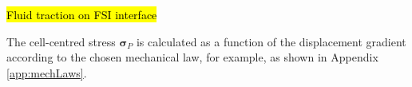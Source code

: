 \documentclass[sn-mathphys,Numbered]{sn-jnl}%
\newcommand{\bb}{\boldsymbol}
\begin{document}
\hl{Fluid traction on FSI interface}

The cell-centred stress $\bb{\sigma}_P$ is calculated as a function of the displacement gradient according to the chosen mechanical law, for example, as shown in Appendix \ref{app:mechLaws}.


\end{document}
